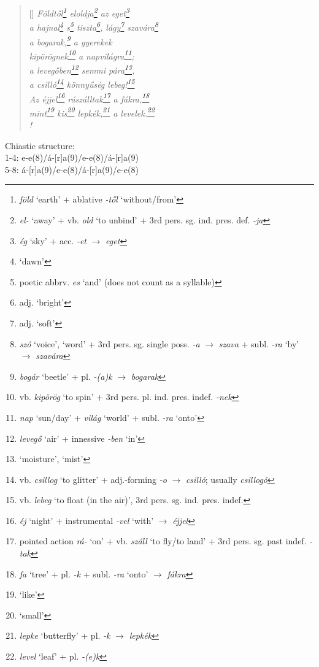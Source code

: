 \documentclass[a4paper,12pt,twoside,final]{book}
\begin{document}
\begin{verse}[\versewidth]
  \it
  Földtől\footnote{\emph{föld} `earth' +
  ablative \emph{-től} `without/from'} eloldja\footnote{\emph{el-} `away'
  + vb. \emph{old} `to unbind' + 3rd
  pers. sg. ind. pres. def. \emph{-ja}} az eget\footnote{\emph{ég}
  `sky' + acc. \emph{-et} $\rightarrow$ \emph{eget}} \\
  a hajnal\footnote{`dawn'} s\footnote{poetic abbrv. \emph{es} `and'
  (does not count as a syllable)} tiszta\footnote{adj. `bright'},
  lágy\footnote{adj. `soft'} szavára\footnote{\emph{szó} `voice',
  `word' + 3rd pers. sg. single poss. \emph{-a} $\rightarrow$
  \emph{szava} + subl. \emph{-ra} `by' $\rightarrow$
  \emph{szavára}} \\

  a bogarak,\footnote{\emph{bogár} `beetle' + pl. \emph{-(a)k}
  $\rightarrow$ \emph{bogarak}} a gyerekek \\
  kipörögnek\footnote{vb. \emph{kipörög} `to spin' + 3rd
  pers. pl. ind. pres. indef. \emph{-nek}}
  a napvilágra\footnote{\emph{nap} `sun/day' + \emph{világ}
  `world' + subl. \emph{-ra} `onto'}; \\
  a levegőben\footnote{\emph{levegő} `air' +
  innessive \emph{-ben} `in'} semmi pára\footnote{`moisture', `mist'}, \\
  a csilló\footnote{vb. \emph{csillog} `to glitter' +
  adj.-forming \emph{-o} $\rightarrow$
  \emph{csilló}; usually \emph{csillogó}} könnyűség
  lebeg!\footnote{vb. \emph{lebeg} `to float (in the air)', 3rd
  pers. sg. ind. pres. indef.} \\
  Az éjjel\footnote{\emph{éj} `night' + instrumental \emph{-vel}
  `with' $\rightarrow$ \emph{éjjel}} rászálltak\footnote{pointed
  action \emph{rá-} `on' + vb. \emph{száll} `to fly/to
  land' + 3rd pers. sg. past indef. \emph{-tak}} a
  fákra,\footnote{\emph{fa} `tree' +
  pl. \emph{-k} + subl. \emph{-ra} `onto' $\rightarrow$ \emph{fákra}} \\
  mint\footnote{`like'} kis\footnote{`small'} lepkék,\footnote{\emph{lepke}
  `butterfly' + pl. \emph{-k} $\rightarrow$ \emph{lepkék}} a
  levelek.\footnote{\emph{level} `leaf' + pl. \emph{-(e)k}} \\!
\end{verse}

\noindent Chiastic structure: \\
1-4: e-e(8)/á-[r]a(9)/e-e(8)/á-[r]a(9) \\
5-8: á-[r]a(9)/e-e(8)/á-[r]a(9)/e-e(8)

\newpage
\end{document}
